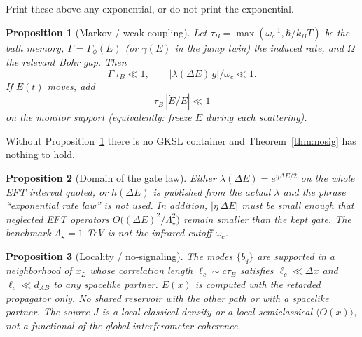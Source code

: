 \documentclass[11pt]{article}
\theoremstyle{definition}
\theoremstyle{plain}
\newtheorem{proposition}{Proposition}[section]
\begin{document}
Print these above any exponential, or do not print the exponential.

\begin{proposition}[Markov / weak coupling]\label{prop:markov}
Let $\tau_B = \max(\omega_c^{-1}, \hbar/k_B T)$ be the bath memory, $\Gamma = \Gamma_\phi(E)$ (or
$\gamma(E)$ in the jump twin) the induced rate, and $\Omega$ the relevant Bohr gap. Then
\begin{equation}
\Gamma\, \tau_B \ll 1, \qquad |\lambda(\Delta E)\, g|/\omega_c \ll 1.
\label{eq:markovcond}
\end{equation}
If $E(t)$ moves, add
\begin{equation}
\tau_B\, |\dot E / E| \ll 1
\label{eq:slow}
\end{equation}
on the monitor support (equivalently: freeze $E$ during each scattering).
\end{proposition}

Without Proposition~\ref{prop:markov} there is no GKSL container and Theorem~\ref{thm:nosig} has
nothing to hold.

\begin{proposition}[Domain of the gate law]\label{prop:gate}
Either $\lambda(\Delta E) = e^{\eta\Delta E/2}$ on the whole EFT interval quoted, or $h(\Delta E)$ is
published from the actual $\lambda$ and the phrase ``exponential rate law'' is not used.
In addition, $|\eta\,\Delta E|$ must be small enough that neglected EFT operators
$O\!\big((\Delta E)^2/\Lambda_\star^2\big)$ remain smaller than the kept gate. The benchmark
$\Lambda_\star = 1$ TeV is not the infrared cutoff $\omega_c$.
\end{proposition}

\begin{proposition}[Locality / no-signaling]\label{prop:locality}
The modes $\{b_q\}$ are supported in a neighborhood of $x_L$ whose correlation length $\ell_c \sim c\tau_B$
satisfies $\ell_c \ll \Delta x$ and $\ell_c \ll d_{AB}$ to any spacelike partner. $E(x)$ is computed with the
retarded propagator only. No shared reservoir with the other path or with a spacelike partner. The
source $J$ is a local classical density or a local semiclassical $\langle O(x)\rangle$, not a functional of
the global interferometer coherence.
\end{proposition}
\end{document}
